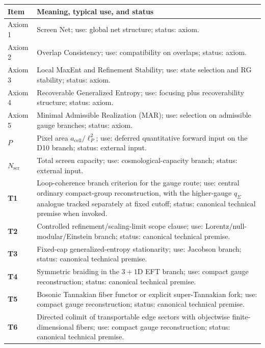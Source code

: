 {\def\LTcaptype{none}
\tiny
\setlength{\tabcolsep}{1pt}
\begin{longtable}{@{}>{\RaggedRight\arraybackslash}p{}>{\RaggedRight\arraybackslash}p{}@{}}
\toprule\noalign{}
Item & Meaning, typical use, and status \\
\midrule\noalign{}
\endhead
\bottomrule\noalign{}
\endlastfoot
Axiom 1 & Screen Net; use: global net structure; status: axiom. \\
Axiom 2 & Overlap Consistency; use: compatibility on overlaps; status: axiom. \\
Axiom 3 & Local MaxEnt and Refinement Stability; use: state selection and RG stability; status: axiom. \\
Axiom 4 & Recoverable Generalized Entropy; use: focusing plus recoverability structure; status: axiom. \\
Axiom 5 & Minimal Admissible Realization (MAR); use: selection on admissible gauge branches; status: axiom. \\
\(P\) & Pixel area \(a_{\mathrm{cell}}/\ell_P^2\); use: deferred quantitative forward input on the D10 branch; status: external input. \\
\(N_{\mathrm{scr}}\) & Total screen capacity; use: cosmological-capacity branch; status: external input. \\
\textbf{T1} & Loop-coherence branch criterion for the gauge route; use: central ordinary compact-group reconstruction, with the higher-gauge \(q_\Sigma\) analogue tracked separately at fixed cutoff; status: canonical technical premise when invoked. \\
\textbf{T2} & Controlled refinement/scaling-limit scope clause; use: Lorentz/null-modular/Einstein branch; status: canonical technical premise. \\
\textbf{T3} & Fixed-cap generalized-entropy stationarity; use: Jacobson branch; status: canonical technical premise. \\
\textbf{T4} & Symmetric braiding in the \(3+1\)D EFT branch; use: compact gauge reconstruction; status: canonical technical premise. \\
\textbf{T5} & Bosonic Tannakian fiber functor or explicit super-Tannakian fork; use: compact gauge reconstruction; status: canonical technical premise. \\
\textbf{T6} & Directed colimit of transportable edge sectors with objectwise finite-dimensional fibers; use: compact gauge reconstruction; status: canonical technical premise. \\
\end{longtable}
}

